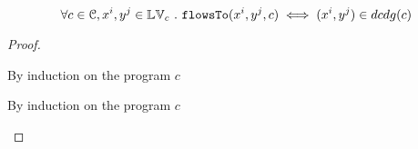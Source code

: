 \begin{thm}
    \label{thm:rd_soundness}
    \[
    \forall c \in \mathcal{C}, x^i, y^j \in \mathbb{LV}_c ~.~ 
    \mathtt{flowsTo}(x^i, y^j, c) \iff (x^i, y^j) \in dcdg(c)
    \]
    \end{thm}
\begin{proof}
    \begin{subproof}[$\implies$]
        By induction on the program $c$
    \end{subproof}
    \begin{subproof}[$\Leftarrow$]
        By induction on the program $c$
    \end{subproof}    
\end{proof}
